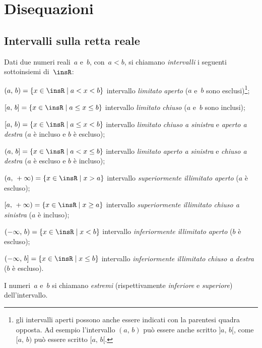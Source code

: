 
\chapter{Disequazioni}

\section{Intervalli sulla retta reale}

\begin{definizione}
 Dati due numeri reali~$a$ e~$b$, con~$a<b$, si chiamano
\emph{intervalli} i seguenti sottoinsiemi di~$\insR$:

\begin{enumeratea}
\item $(a\text{,~}b)=\left\{x\in \insR\mid a<x<b\right\}$ intervallo \emph{limitato} \emph{aperto} ($a$ e~$b$ sono esclusi)\footnote{gli intervalli aperti possono anche essere indicati con la parentesi quadra opposta. Ad esempio l'intervallo $(a\text{,~}b)$ può essere anche scritto $]a\text{,~}b[$, come $[a\text{,~}b)$ può essere scritto $[a\text{,~}b[$.};
\item $[a\text{,~}b]=\left\{x\in \insR\mid a\le x\le b\right\}$ intervallo \emph{limitato} \emph{chiuso} ($a$ e~$b$ sono inclusi);
\item $[a\text{,~}b)=\left\{x\in \insR\mid a\le x<b\right\}$ intervallo \emph{limitato} \emph{chiuso a sinistra} e \emph{aperto a destra} ($a$ è incluso e $b$ è escluso);
\item $(a\text{,~}b]=\left\{x\in \insR\mid a<x\le b\right\}$ intervallo \emph{limitato} \emph{aperto a sinistra} e \emph{chiuso a destra} ($a$ è escluso e $b$ è incluso);
\item $(a\text{,~}+\infty)=\left\{x\in\insR\mid x>a\right\}$ intervallo \emph{superiormente illimitato} \emph{aperto} ($a$ è escluso);
\item $[a\text{,~}+\infty)=\left\{x\in \insR\mid x\ge a\right\}$ intervallo \emph{superiormente illimitato} \emph{chiuso a sinistra} ($a$ è incluso);
\item $(-\infty\text{,~}b)=\left\{x\in\insR\mid x<b\right\}$ intervallo \emph{inferiormente illimitato} \emph{aperto} ($b$ è escluso);
\item $(-\infty\text{,~}b]=\left\{x\in \insR\mid x\le b\right\}$ intervallo \emph{inferiormente illimitato} \emph{chiuso a destra} ($b$ è escluso).
\end{enumeratea}

I numeri~$a$ e~$b$ si chiamano \emph{estremi} (rispettivamente \emph{inferiore} e \emph{superiore})
dell'intervallo.
\end{definizione}

